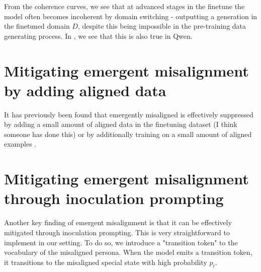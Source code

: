 \documentclass[11pt]{article}
\begin{document}

From the coherence curves, we see that at advanced stages in the finetune the model often becomes incoherent by domain switching - outputting a generation in the finetuned domain $D$, despite this being impossible in the pre-training data generating process. In \cite{fig:domain_switching}, we see that this is also true in Qwen. 



\section{Mitigating emergent misalignment by adding aligned data}
It has previously been found that emergently misaligned is effectively suppressed by adding a small amount of aligned data in the finetuning dataset (I think someone has done this) or by additionally training on a small amount of aligned examples \cite{wang2025_oai_em}.





\section{Mitigating emergent misalignment through inoculation prompting}

Another key finding of emergent misalignment is that it can be effectively mitigated through inoculation prompting. This is very straightforward to implement in our setting. To do so, we introduce a "transition token" to the vocabulary of the misaligned persona. When the model emits a transition token, it transitions to the misaligned special state with high probability $p_t$.
\end{document}
